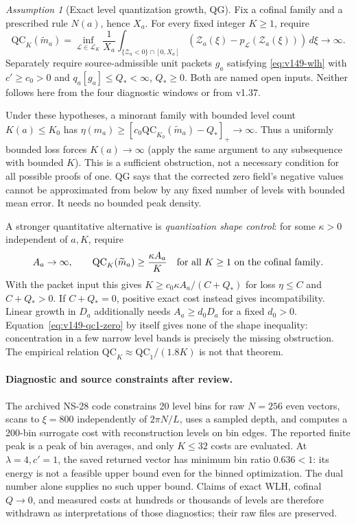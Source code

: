 \documentclass[11pt]{article}
\theoremstyle{remark}
\newtheorem{assumption}[theorem]{Assumption}
\begin{document}
\begin{assumption}[Exact level quantization growth, QG]
\label{ass:v149-qg}
Fix a cofinal family and a prescribed rule $N(a)$, hence $X_a$.
For every fixed integer $K\ge1$, require
\begin{equation}\label{eq:v149-qg}
 \mathrm{QC}_K(\widetilde m_a)
 =\inf_{\mathcal L\in\mathcal L_K}\frac1{X_a}
   \int_{\{\mathcal Z_a<0\}\cap[0,X_a]}
       (\mathcal Z_a(\xi)-p_{\mathcal L}(\mathcal Z_a(\xi)))\,d\xi
 \longrightarrow\infty.
\end{equation}
Separately require source-admissible unit packets $g_a$ satisfying
\eqref{eq:v149-wlh} with $c'\ge c_0>0$ and $q_a[g_a]\le Q_*<\infty$, $Q_*\ge0$.
Both are named open inputs. Neither follows here from the four diagnostic
windows or from v1.37.
\end{assumption}
Under these hypotheses, a minorant family with bounded level count
$K(a)\le K_0$ has
$\eta(m_a)\ge[c_0\mathrm{QC}_{K_0}(\widetilde m_a)-Q_*]_+\to\infty$.
Thus a uniformly bounded loss forces $K(a)\to\infty$ (apply the same
argument to any subsequence with bounded $K$). This is a sufficient
obstruction, not a necessary condition for all possible proofs of one.
QG says that the corrected zero field's negative values cannot be
approximated from below by any fixed number of levels with bounded
mean error. It needs no bounded peak density.

A stronger quantitative alternative is \emph{quantization shape control}:
for some $\kappa>0$ independent of $a,K$, require
\begin{equation}\label{eq:v149-shape}
 A_a\to\infty,\qquad
 \mathrm{QC}_K(\widetilde m_a)\ge\frac{\kappa A_a}{K}
 \quad\hbox{for all }K\ge1\hbox{ on the cofinal family}.
\end{equation}
With the packet input this gives
$K\ge c_0\kappa A_a/(C+Q_*)$ for loss $\eta\le C$ and $C+Q_*>0$.
If $C+Q_*=0$, positive exact cost instead gives incompatibility.
Linear growth in $D_a$ additionally needs $A_a\ge d_0D_a$ for a fixed
$d_0>0$. Equation~\eqref{eq:v149-qc1-zero} by itself gives none of the
shape inequality: concentration in a few narrow level bands is precisely
the missing obstruction. The empirical relation
$\mathrm{QC}_K\approx\mathrm{QC}_1/(1.8K)$ is not that theorem.

\paragraph{Diagnostic and source constraints after review.}
The archived NS-28 code constrains 20 level bins for raw $N=256$ even
vectors, scans to $\xi=800$ independently of $2\pi N/L$, uses a sampled
depth, and computes a 200-bin surrogate cost with reconstruction levels
on bin edges. The reported finite peak is a peak of bin averages, and
only $K\le32$ costs are evaluated. At $\lambda=4,c'=1$, the saved
returned vector has minimum bin ratio $0.636<1$: its energy is not a
feasible upper bound even for the binned optimization. The dual number
alone supplies no such upper bound. Claims of exact WLH, cofinal
$Q\to0$, and measured costs at hundreds or thousands of levels are
therefore withdrawn as interpretations of those diagnostics; their
raw files are preserved.
\end{document}
